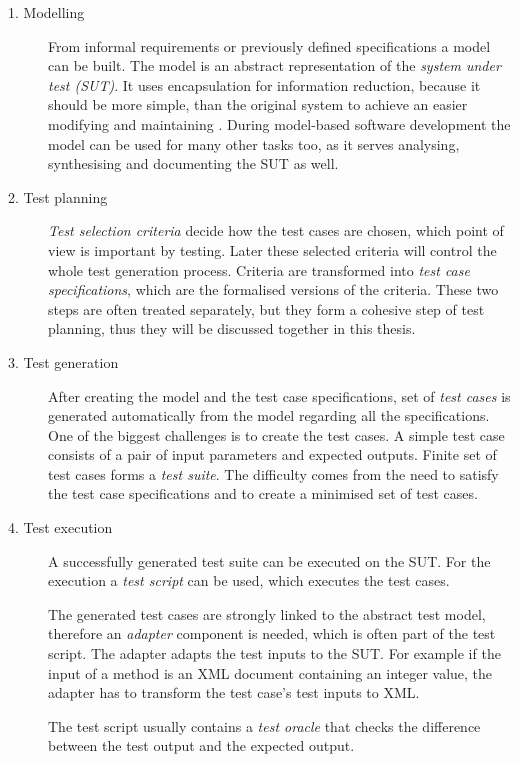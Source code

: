 \begin{description}
    \item[1. Modelling] From informal requirements or previously defined specifications a model can be built. The model is an abstract representation of the \textit{system under test (SUT)}. It uses encapsulation for information reduction, because it should be more simple, than the original system to achieve an easier modifying and maintaining \cite{mbttestcasegeneration}. During model-based software development the model can be used for many other tasks too, as it serves analysing, synthesising and documenting the SUT as well.
     \item[2. Test planning] \textit{Test selection criteria} decide how the test cases are chosen, which point of view is important by testing. Later these selected criteria will control the whole test generation process. Criteria are transformed into \textit{test case specifications}, which are the formalised versions of the criteria. These two steps are often treated separately, but they form a cohesive step of test planning, thus they will be discussed together in this thesis.
     \item[3. Test generation] After creating the model and the test case specifications, set of \textit{test cases} is generated automatically from the model regarding all the specifications. One of the biggest challenges is to create the test cases. A simple test case consists of a pair of input parameters and expected outputs. Finite set of test cases forms a \textit{test suite}. The difficulty comes from the need to satisfy the test case specifications and to create a minimised set of test cases.
     \item[4. Test execution] A successfully generated test suite can be executed on the SUT. For the execution a \textit{test script} can be used, which executes the test cases.
     
     The generated test cases are strongly linked to the abstract test model, therefore an \textit{adapter} component is needed, which is often part of the test script. The adapter adapts the test inputs to the SUT. For example if the input of a method is an XML document containing an integer value, the adapter has to transform the test case's test inputs to XML.
     
     The test script usually contains a \textit{test oracle} that checks the difference between the test output and the expected output.
\end{description}

